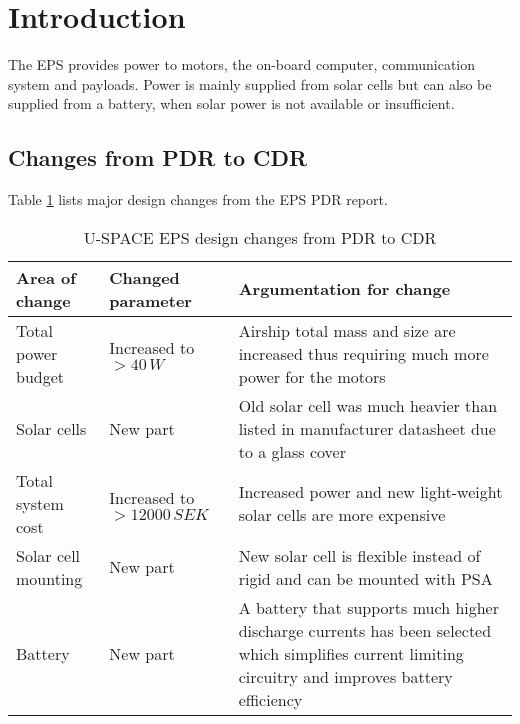 \newpage
\section{Introduction}
\label{sec:introduction}

The \ac{EPS} provides power to motors, the on-board computer, communication system and payloads. Power is mainly supplied from solar cells but can also be supplied from a battery, when solar power is not available or insufficient. 

\subsection{Changes from PDR to CDR}
\label{sec:changes_pdr_to_cdr}
%
Table \ref{tab:pdr_to_cdr} lists major design changes from the \ac{EPS} \ac{PDR} report.

\begin{table}[H]
\centering
\caption{U-SPACE \ac{EPS} design changes from PDR to CDR}
\label{tab:pdr_to_cdr}
\begin{tabular}{p{}p{}p{}}
\hline
\textbf{Area of change} & \textbf{Changed parameter } & \textbf{Argumentation for change}\\
\hline
Total power budget & Increased to $>40\,W$ & Airship total mass and size are increased thus requiring much more power for the motors\\
Solar cells & New part & Old solar cell was much heavier than listed in manufacturer datasheet due to a glass cover\\
Total system cost & Increased to $>12000\,SEK$ & Increased power and new light-weight solar cells are more expensive\\
Solar cell mounting & New part & New solar cell is flexible instead of rigid and can be mounted with \ac{PSA}\\
Battery & New part & A battery that supports much higher discharge currents has been selected which simplifies current limiting circuitry and improves battery efficiency\\
\hline
\end{tabular}
\end{table} 
